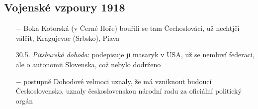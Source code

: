 \documentclass{article}
\begin{document}
\subsection*{Vojenské vzpoury 1918}
\begin{itemize}
    \vspace{-0.5em}
    \setlength\itemsep{0.15em}
    \item[$-$] Boka Kotorská (v Černé Hoře) bouřili se tam Čechoslováci, už nechtjěí válčit, Kragujevac (Srbsko), Piava
    \item[30.5.] \textit{Pitsburská dohoda}: podepisuje ji masaryk v USA, už se nemluví federaci, ale o autonomii Slovenska, což nebylo dodrženo
    \item[$-$] postupně Dohodové velmoci uznaly, že má vzniknout budoucí Československo, uznaly československou národní radu za oficiální politický orgán
\end{itemize}
\end{document}
